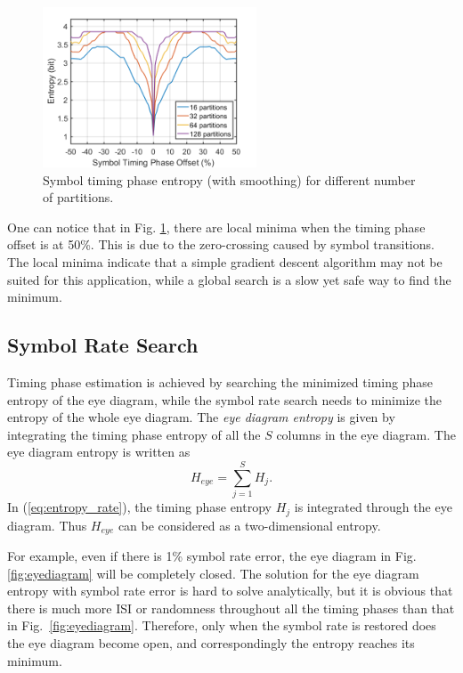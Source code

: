 \documentclass[journal,comsoc]{IEEEtran}
\begin{document}
\begin{figure}[htbp]
\centering
\includegraphics[width=2.5in]{phase_entropy.png}
\caption{Symbol timing phase entropy (with smoothing) for different number of partitions.}
\label{fig:phase_entropy} 
\end{figure}
One can notice that in Fig. \ref{fig:phase_entropy}, there are  local minima when the timing phase offset is at 50\%.
This is due to the zero-crossing caused by symbol transitions.
The local minima indicate that a simple gradient descent algorithm may not be suited for this application, while a global search is a slow yet safe way to find the minimum.



\subsection{Symbol Rate Search}
\label{sec:symbol_rate}
Timing phase estimation is achieved by searching the minimized timing phase entropy of the eye diagram,
while the symbol rate search needs to minimize the entropy of the whole eye diagram.
The \textit{eye diagram entropy} is given by integrating the timing phase entropy of all the \(S\) columns in the eye diagram.
The eye diagram entropy is written as
\begin{equation}
H_{eye} =   \sum\limits_{j = 1}^S {H_j}.
\label{eq:entropy_rate}
\end{equation}
In (\ref{eq:entropy_rate}), the timing phase entropy \(H_j\) is integrated through the eye diagram.
Thus $H_{eye}$ can be considered as a two-dimensional entropy.


For example, even if there is 1\% symbol rate error, the eye diagram in Fig. \ref{fig:eyediagram} will be completely closed.
The solution for the eye diagram entropy with symbol rate error is hard to solve analytically, 
but it is obvious that there is much more ISI or randomness throughout all the timing phases than that in Fig.~\ref{fig:eyediagram}.
Therefore, only when the symbol rate is restored does the eye diagram become open, and correspondingly the entropy reaches its minimum.
\end{document}
